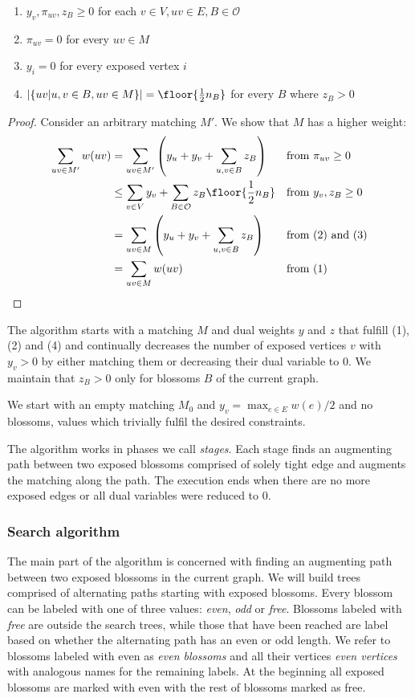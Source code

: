 \begin{enumerate}
    \item $y_v, \pi_{uv}, z_B \geq 0$ for each $v \in V, uv \in E, B \in \mathcal{O}$
    \item $\pi_{uv} = 0$ for every $uv \in M$
    \item $y_i = 0$ for every exposed vertex $i$
    \item $|\{uv|u, v\in B, uv \in M\}| = \floor{\frac{1}{2}n_B}$ for every $B$ where $z_B > 0$
\end{enumerate}

\begin{proof}
Consider an arbitrary matching $M'$. We show that $M$ has a higher weight:
\begin{align*}
    \sum_{uv \in M'} w(uv) &= \sum_{uv \in M'} \left( y_u + y_v + \sum_{u, v \in B} z_B \right) && \text{from } \pi_{uv} \geq 0 \\
    &\leq \sum_{v \in V} y_v + \sum_{B \in \mathcal{O}} z_B\floor{\frac{1}{2}n_B} && \text{from } y_v, z_B \geq 0 \\
    &= \sum_{uv \in M} \left( y_u + y_v + \sum_{u, v \in B} z_B \right) && \text{from (2) and (3)}\\
    &= \sum_{uv \in M} w(uv) && \text{from (1)}\\
\end{align*}
\end{proof}

The algorithm starts with a matching $M$ and dual weights $y$ and $z$ that fulfill (1), (2) and (4) and continually decreases the number of exposed vertices $v$ with $y_v > 0$ by either matching them or decreasing their dual variable to $0$. We maintain that $z_B > 0$ only for blossoms $B$ of the current graph.

We start with an empty matching $M_0$ and $y_v = \max_{e \in E} w(e)/2$ and no blossoms, values which trivially fulfil the desired constraints.

The algorithm works in phases we call \textit{stages}. Each stage finds an augmenting path between two exposed blossoms comprised of solely tight edge and augments the matching along the path. The execution ends when there are no more exposed edges or all dual variables were reduced to $0$.

\subsubsection{Search algorithm}

The main part of the algorithm is concerned with finding an augmenting path between two exposed blossoms in the current graph. We will build trees comprised of alternating paths starting with exposed blossoms. Every blossom can be labeled with one of three values: \textit{even}, \textit{odd} or \textit{free}. Blossoms labeled with \textit{free} are outside the search trees, while those that have been reached are label based on whether the alternating path has an even or odd length. We refer to blossoms labeled with even as \textit{even blossoms} and all their vertices \textit{even vertices} with analogous names for the remaining labels. At the beginning all exposed blossoms are marked with even with the rest of blossoms marked as free.

